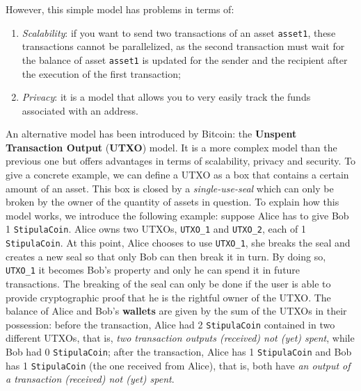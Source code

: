 However, this simple model has problems in terms of:
\begin{enumerate}
	\item \textit{Scalability}: if you want to send two transactions of an asset \verb|asset1|, these 
	transactions cannot be parallelized, as the second transaction must wait for the balance of asset 
	\verb|asset1| is updated for the sender and the recipient after the execution of the first transaction;
	\item \textit{Privacy}: it is a model that allows you to very easily track the funds associated with an 
	address.
\end{enumerate}

An alternative model has been introduced by Bitcoin: the \textbf{Unspent Transaction Output} (\textbf{UTXO}) 
model. It is a more complex model than the previous one but offers advantages in terms of scalability, 
privacy and security. To give a concrete example, we can define a UTXO as a box that contains a certain 
amount of an asset. This box is closed by a \textit{single-use-seal} which can only be broken by the owner 
of the quantity of assets in question. To explain how this model works, we introduce the following example: 
suppose Alice has to give Bob 1 \verb|StipulaCoin|. Alice owns two UTXOs, \verb|UTXO_1| and \verb|UTXO_2|, 
each of 1 \verb|StipulaCoin|. At this point, Alice chooses to use \verb|UTXO_1|, she breaks the seal and 
creates a new seal so that only Bob can then break it in turn. By doing so, \verb|UTXO_1| it becomes Bob's 
property and only he can spend it in future transactions. The breaking of the seal can only be done if the 
user is able to provide cryptographic proof that he is the rightful owner of the UTXO. The balance of Alice 
and Bob's \textbf{wallets} are given by the sum of the UTXOs in their possession: before the transaction, 
Alice had 2 \verb|StipulaCoin| contained in two different UTXOs, that is, \textit{two transaction outputs 
(received) not (yet) spent}, while Bob had 0 \verb|StipulaCoin|; after the transaction, Alice has 1 
\verb|StipulaCoin| and Bob has 1 \verb|StipulaCoin| (the one received from Alice), that is, both have 
\textit{an output of a transaction (received) not (yet) spent}.

